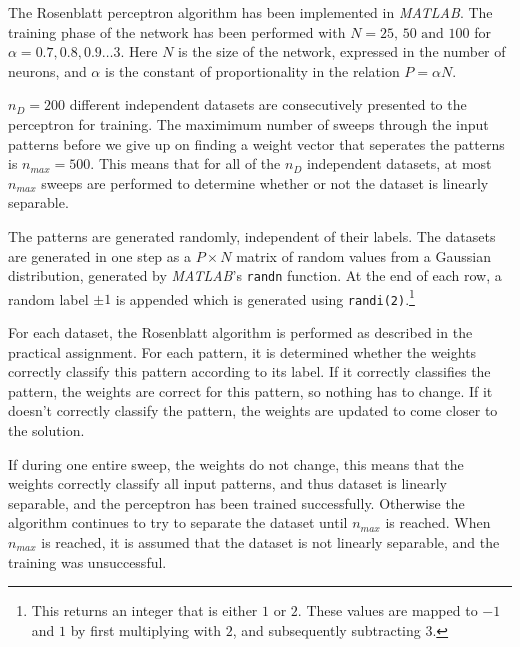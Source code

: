The Rosenblatt perceptron algorithm has been implemented in \emph{MATLAB}.
The training phase of the network has been performed with \(N=25\text{, } 50 \text{ and } 100\) for \(\alpha = 0.7, 0.8, 0.9 \dots 3\).
Here \(N\) is the size of the network, expressed in the number of neurons, and \(\alpha\) is the constant of proportionality in the relation \(P = \alpha N\).

\(n_D = 200\) different independent datasets are consecutively presented to the perceptron for training.
The maximimum number of sweeps through the input patterns before we give up on finding a weight vector that seperates the patterns is \(n_{max} = 500\).
This means that for all of the \(n_D\) independent datasets, at most \(n_{max}\) sweeps are performed to determine whether or not the dataset is linearly separable.

The patterns are generated randomly, independent of their labels.
The datasets are generated in one step as a \(P \times N\) matrix of random values from a Gaussian distribution, generated by \emph{MATLAB}'s \texttt{randn} function.
At the end of each row, a random label \(\pm 1\) is appended which is generated using \texttt{randi(2)}.\footnote{
	This returns an integer that is either \(1\) or \(2\).
	These values are mapped to \(-1\) and \(1\) by first multiplying with \(2\), and subsequently subtracting \(3\).
}

For each dataset, the Rosenblatt algorithm is performed as described in the practical assignment.
For each pattern, it is determined whether the weights correctly classify this pattern according to its label.
If it correctly classifies the pattern, the weights are correct for this pattern, so nothing has to change.
If it doesn't correctly classify the pattern, the weights are updated to come closer to the solution.

If during one entire sweep, the weights do not change, this means that the weights correctly classify all input patterns, and thus dataset is linearly separable, and the perceptron has been trained successfully.
Otherwise the algorithm continues to try to separate the dataset until \(n_{max}\) is reached.
When \(n_{max}\) is reached, it is assumed that the dataset is not linearly separable, and the training was unsuccessful.